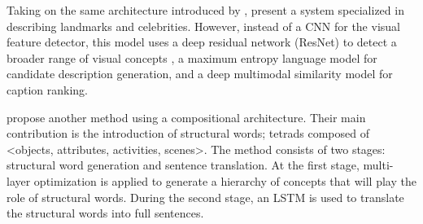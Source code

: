 Taking on the same architecture introduced by \citet{Fang2015}, \citet{Tran2016} present a system specialized in describing landmarks and celebrities. However, instead of a CNN for the visual feature detector, this model uses a deep residual network (ResNet) to detect a broader range of visual concepts \cite{He2016a}, a maximum entropy language model for candidate description generation, and a deep multimodal similarity model for caption ranking. 

\citet{Ma2016} propose another method using a compositional architecture. Their main contribution is the introduction of structural words; tetrads composed of <objects, attributes, activities, scenes>. The method consists of two stages: structural word generation and sentence translation. At the first stage, multi-layer optimization is applied to generate a hierarchy of concepts that will play the role of structural words. During the second stage, an LSTM is used to translate the structural words into full sentences.

